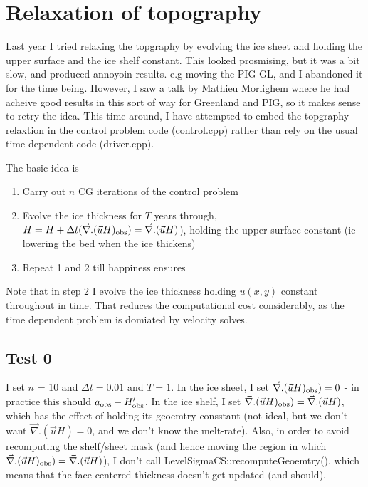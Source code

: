\documentclass{article}
\begin{document}
\section{\label{sec::toporelax} Relaxation of topography}

Last year I tried relaxing the topgraphy by evolving the ice sheet and holding the upper surface and the ice shelf constant. 
This looked prosmising, but it was a bit slow, and produced annoyoin results. e.g moving the PIG
GL, and I abandoned it for the time being. However, I saw a talk by Mathieu Morlighem where he had acheive
good results in this sort of way for Greenland and PIG, so it makes sense to retry the idea. This time around, 
I have attempted to embed the topgraphy relaxtion in the control problem code (control.cpp) rather than rely on the
usual time dependent code (driver.cpp).

The basic idea is
\begin{enumerate}
\item{Carry out $n$ CG iterations of the control problem}
\item{Evolve the ice thickness for $T$ years through, $H = H + \Delta t ( \vec{\nabla}. (\vec{u} H)_{\rm obs}) = \vec{\nabla}. (\vec{u} H)$),
  holding the upper surface constant (ie lowering the bed when the ice thickens) }
\item{Repeat 1 and 2 till happiness ensures}
\end{enumerate}
Note that in step 2 I evolve the ice thickness holding $u(x,y)$ constant throughout
in time. That reduces the computational cost considerably, as the time dependent problem 
is domiated by velocity solves.

\subsection{Test 0}


I set $n$ = 10 and $\Delta t = 0.01$ and $T=1$. In the ice sheet, I set 
$\vec{\nabla}. (\vec{u} H)_{\rm obs}) = 0$ - in practice this should $a_{\rm obs} - H'_{\rm obs}$.
In the ice shelf,  I set $\vec{\nabla}. (\vec{u} H)_{\rm obs}) = \vec{\nabla}. (\vec{u} H)$,
which has the effect of holding its geoemtry consstant (not ideal, but we don't want $\vec{\nabla}. (\vec{u} H) = 0$, and we don't
know the melt-rate). Also, in order to avoid recomputing the shelf/sheet mask (and hence moving the region 
in which $\vec{\nabla}. (\vec{u} H)_{\rm obs}) = \vec{\nabla}. (\vec{u} H)$), I don't call LevelSigmaCS::recomputeGeoemtry(), 
which means that the face-centered thickness doesn't get updated (and should). 
\end{document}
